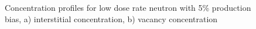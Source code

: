 \documentclass[a4paper]{article}
\begin{document}
    \begin{figure}[h!]  %
      \centering
      \qquad
      \caption{Concentration profiles for low dose rate neutron with 5\% production bias, a) interstitial concentration, b) vacancy concentration}
      \label{figure:concentrations_neutron_5_1e-6}
    \end{figure}\\
\end{document}
